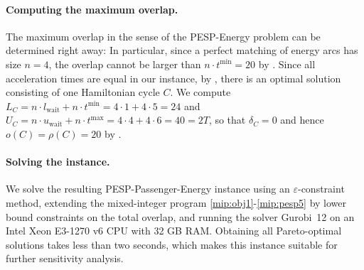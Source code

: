 \documentclass[11pt,a4paper]{article}
\newcommand{\wait}{\mathrm{wait}}
\newcommand{\pespenergy}{PESP-Energy\xspace}
\newcommand{\pesppassenergy}{PESP-Passenger-Energy\xspace}
\newcommand{\w}{\rho} %
\theoremstyle{definition}
\theoremstyle{remark}
\begin{document}
\paragraph{Computing the maximum overlap.}
The maximum overlap in the sense of the \pespenergy problem can be determined right away: In particular, since a perfect matching of energy arcs has size $n = 4$, the overlap cannot be larger than $n \cdot t^{\min} = 20$ by . Since all acceleration times are equal in our instance, by , there is an optimal solution consisting of one Hamiltonian cycle $C$. We compute $L_C = n \cdot l_\wait + n \cdot t^{\min} = 4 \cdot 1 + 4 \cdot 5 = 24$ and $U_C = n \cdot u_\wait + n \cdot t^{\max} = 4 \cdot 4 + 4 \cdot 6 = 40 = 2T$, so that $\delta_C = 0$ and hence $o(C) = \w(C) = 20$ by .

\paragraph{Solving the instance.}
We solve the resulting \pesppassenergy instance using an $\varepsilon$\nobreakdash-constraint method, extending the mixed-integer program \eqref{mip:obj1}-\eqref{mip:pesp5} by lower bound constraints on the total overlap, and running the solver Gurobi~12 \cite{gurobi} on an Intel Xeon E3-1270 v6 CPU with 32 GB RAM. Obtaining all Pareto-optimal solutions takes less than two seconds, which makes this instance suitable for further sensitivity analysis.
\end{document}
